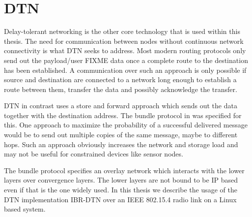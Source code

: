 \section{DTN}
\label{introdtn}
Delay-tolerant networking is the other core technology that is used within this
thesis. The need for communication between nodes without continuous network
connectivity is what DTN seeks to address. Most modern routing protocols only
send out the payload/user FIXME data once a complete route to the destination has been established.
A communication over such an approach is only possible if source and destination
are connected to a network long enough to establish a route between them,
transfer the data and possibly acknowledge the transfer.

DTN in contrast uses a store and forward approach which sends out the data
together with the destination address. The bundle protocol in
\cite{RFC5050} was specified for this. One approach to maximize the probability
of a successful delivered message would be to send out multiple copies of the
same message, maybe to different hops. Such an approach obviously increases the
network and storage load and may not be useful for constrained devices like
sensor nodes.

The bundle protocol specifies an overlay network which interacts with the lower
layers over convergence layers. The lower layers are not bound to be IP
based even if that is the one widely used. In this thesis we describe the usage
of the DTN implementation IBR-DTN over an IEEE 802.15.4 radio link on a Linux
based system.
